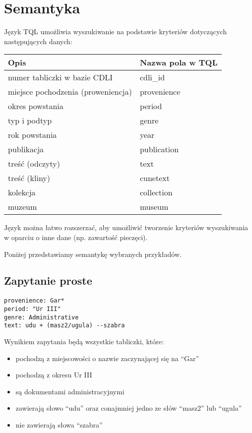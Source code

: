 \chapter{Semantyka}
Język TQL umożliwia wyszukiwanie na podstawie kryteriów dotyczących następujących danych:
\begin{longtable}{|p{3in}|p{3in}|}
\hline
{\bf Opis} & {\bf Nazwa pola w TQL}\\
\hline
\endhead
numer tabliczki w bazie CDLI & cdli\_id
\\
\hline
miejsce pochodzenia (proweniencja) & provenience
\\
\hline
okres powstania & period
\\
\hline
typ i podtyp & genre
\\
\hline
rok powstania & year 
\\
\hline
publikacja & publication
\\
\hline
treść (odczyty)& text
\\
\hline
treść (kliny) & cunetext
\\
\hline
kolekcja & collection
\\
\hline
muzeum & museum
\\
\hline
\end{longtable}
Język można łatwo rozszerzać, aby umożliwić tworzenie kryteriów wyszukiwania w oparciu o inne dane (np. zawartość pieczęci).

Poniżej przedstawiamy semantykę wybranych przykładów.
\section{Zapytanie proste}
\begin{verbatim}
provenience: Gar*
period: "Ur III"
genre: Administrative
text: udu + (masz2/ugula) --szabra
\end{verbatim}
Wynikiem zapytania będą wszystkie tabliczki, które:
\begin{itemize}
 \item pochodzą z miejscowości o nazwie zaczynającej się na ``Gar''
\item pochodzą z okresu Ur III
\item są dokumentami administracyjnymi
\item zawierają słowo ``udu'' oraz conajmniej jedno ze słów ``masz2'' lub ``ugula''
\item nie zawierają słowa ``szabra''
\end{itemize}


